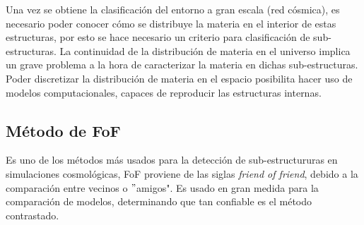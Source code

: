 Una vez se obtiene la clasificación del entorno a gran escala (red cósmica), es necesario poder conocer cómo se distribuye la materia en el interior de estas estructuras, por esto se hace necesario un criterio para clasificación de sub-estructuras. La continuidad de la distribución de materia en el universo implica un grave problema a la hora de caracterizar la materia en dichas sub-estructuras. Poder discretizar la distribución de materia en el espacio posibilita hacer uso de modelos computacionales, capaces de reproducir las estructuras internas.

    \subsection{Método de FoF}
    \label{subsec: FoF}

Es uno de los métodos más usados para la detección de sub-estructururas en simulaciones cosmológicas, FoF proviene de las siglas {\it{friend of friend}}, debido a la comparación entre vecinos o $"$amigos". Es usado en gran medida para la comparación de modelos,  determinando que tan confiable es el método contrastado. 

